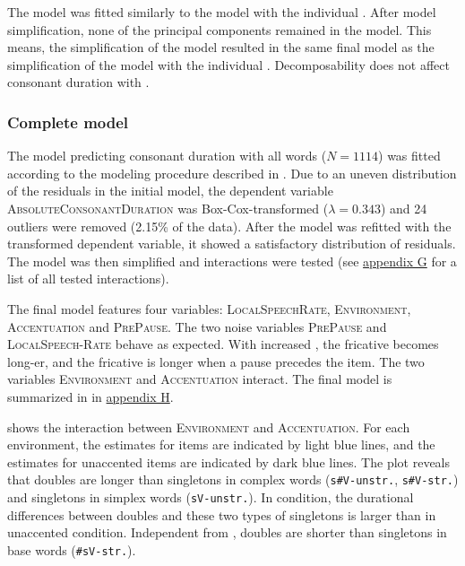 The model was fitted similarly to the model with the individual . After model simplification, none of the principal components remained in the model. This means, the simplification of the model resulted in the same final model as the simplification of the model with the individual . Decomposability does not affect consonant duration with .


\subsubsection{Complete model}

The model predicting consonant duration with all words ($N=1114$) was fitted according to the modeling procedure described in . Due to an uneven distribution of the residuals in the initial model, the dependent variable \textsc{AbsoluteConsonantDuration} was Box-Cox-transformed ($\lambda = 0.343$) and 24 outliers were removed (2.15\% of the data). After the model was refitted with the transformed dependent variable, it showed a satisfactory distribution of residuals.  The model was then simplified and interactions were tested (see \hyperref[Appendix G Summaries of tested interactions in experimental study]{appendix G} for a list of all tested interactions). 

The final model features four variables: \textsc{LocalSpeechRate}, \textsc{Environment}, \textsc{Accentuation} and \textsc{PrePause}. The two noise variables \textsc{PrePause} and \textsc{LocalSpeech-Rate} behave as expected. With increased , the fricative becomes long-er, and the fricative is longer when a pause precedes the item.
 The two variables \textsc{Environment} and \textsc{Accentuation} interact. The final model is summarized in  in \hyperref[Appendix H: Model Summaries Experiment]{appendix H}.




 shows the interaction between \textsc{Environment} and \textsc{Accentuation}. For each environment, the estimates for  items are indicated by light blue lines, and the estimates for unaccented items are indicated by dark blue lines.
The plot reveals that doubles are longer than singletons in complex words (\texttt{s\#V-unstr.}, \texttt{s\#V-str.}) and singletons in simplex words (\texttt{sV-unstr.}). In  condition, the durational differences between doubles and these two types of singletons is larger than in unaccented condition. 
Independent from , doubles are shorter than singletons in base words (\texttt{\#sV-str.}).


